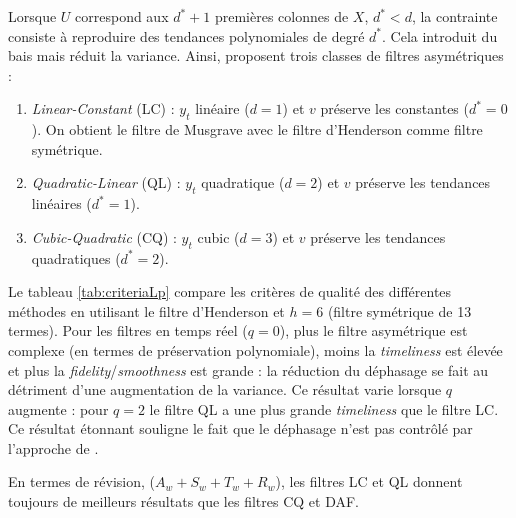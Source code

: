 \documentclass[
  12pt,
  french,
  12pt,a4paper]{article}
\newcommand\1{\mathds{1}}
\begin{document}
Lorsque \(U\) correspond aux \(d^*+1\) premières colonnes de \(X\), \(d^*<d\), la contrainte consiste à reproduire des tendances polynomiales de degré \(d^*\).
Cela introduit du bais mais réduit la variance.
Ainsi, \textcite{proietti2008} proposent trois classes de filtres asymétriques :

\begin{enumerate}
\def\labelenumi{\arabic{enumi}.}
\item
  \emph{Linear-Constant} (LC) : \(y_t\) linéaire (\(d=1\)) et \(v\) préserve les constantes (\(d^*=0\)).
  On obtient le filtre de Musgrave avec le filtre d'Henderson comme filtre symétrique.
\item
  \emph{Quadratic-Linear} (QL) : \(y_t\) quadratique (\(d=2\)) et \(v\) préserve les tendances linéaires (\(d^*=1\)).
\item
  \emph{Cubic-Quadratic} (CQ) : \(y_t\) cubic (\(d=3\)) et \(v\) préserve les tendances quadratiques (\(d^*=2\)).
\end{enumerate}

Le tableau \ref{tab:criteriaLp} compare les critères de qualité des différentes méthodes en utilisant le filtre d'Henderson et \(h=6\) (filtre symétrique de 13 termes).
Pour les filtres en temps réel (\(q=0\)), plus le filtre asymétrique est complexe (en termes de préservation polynomiale), moins la \emph{timeliness} est élevée et plus la \emph{fidelity}/\emph{smoothness} est grande : la réduction du déphasage se fait au détriment d'une augmentation de la variance.
Ce résultat varie lorsque \(q\) augmente : pour \(q=2\) le filtre QL a une plus grande \emph{timeliness} que le filtre LC.
Ce résultat étonnant souligne le fait que le déphasage n'est pas contrôlé par l'approche de \textcite{proietti2008}.

En termes de révision, (\(A_w+S_w+T_w+R_w\)), les filtres LC et QL donnent toujours de meilleurs résultats que les filtres CQ et DAF.
\end{document}
